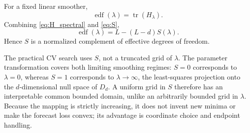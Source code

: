For a fixed linear smoother,
\begin{equation}
\label{eq:edf_definition}
\operatorname{edf}(\lambda)=\operatorname{tr}(H_\lambda).
\end{equation}
Combining \cref{eq:H_spectral} and \cref{eq:S},
\begin{equation}
\label{eq:edf}
\boxed{
\operatorname{edf}(\lambda)
=
L-(L-d)S(\lambda).
}
\end{equation}
Hence $S$ is a normalized complement of effective degrees of freedom.

The practical CV search uses $S$, not a truncated grid of $\lambda$.
The parameter transformation covers both limiting smoothing regimes:
$S=0$ corresponds to $\lambda=0$, whereas $S=1$ corresponds to
$\lambda\to\infty$, the least-squares projection onto the
$d$-dimensional null space of $D_d$. A uniform grid in $S$
therefore has an interpretable common bounded domain, unlike an
arbitrarily bounded grid in $\lambda$. Because the mapping is
strictly increasing, it does not invent new minima or make the
forecast loss convex; its advantage is coordinate choice and
endpoint handling.
